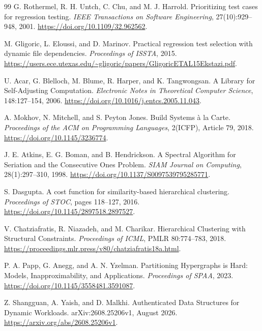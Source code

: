 \begin{thebibliography}{99}
 G. Rothermel, R. H. Untch, C. Chu, and M. J. Harrold. Prioritizing test cases for regression testing. \emph{IEEE Transactions on Software Engineering}, 27(10):929--948, 2001. \url{https://doi.org/10.1109/32.962562}.

 M. Gligoric, L. Eloussi, and D. Marinov. Practical regression test selection with dynamic file dependencies. \emph{Proceedings of ISSTA}, 2015. \url{https://users.ece.utexas.edu/~gligoric/papers/GligoricETAL15Ekstazi.pdf}.

 U. Acar, G. Blelloch, M. Blume, R. Harper, and K. Tangwongsan. A Library for Self-Adjusting Computation. \emph{Electronic Notes in Theoretical Computer Science}, 148:127--154, 2006. \url{https://doi.org/10.1016/j.entcs.2005.11.043}.

 A. Mokhov, N. Mitchell, and S. Peyton Jones. Build Systems \`a la Carte. \emph{Proceedings of the ACM on Programming Languages}, 2(ICFP), Article 79, 2018. \url{https://doi.org/10.1145/3236774}.

 J. E. Atkins, E. G. Boman, and B. Hendrickson. A Spectral Algorithm for Seriation and the Consecutive Ones Problem. \emph{SIAM Journal on Computing}, 28(1):297--310, 1998. \url{https://doi.org/10.1137/S0097539795285771}.

 S. Dasgupta. A cost function for similarity-based hierarchical clustering. \emph{Proceedings of STOC}, pages 118--127, 2016. \url{https://doi.org/10.1145/2897518.2897527}.

 V. Chatziafratis, R. Niazadeh, and M. Charikar. Hierarchical Clustering with Structural Constraints. \emph{Proceedings of ICML}, PMLR 80:774--783, 2018. \url{https://proceedings.mlr.press/v80/chatziafratis18a.html}.

 P. A. Papp, G. Anegg, and A. N. Yzelman. Partitioning Hypergraphs is Hard: Models, Inapproximability, and Applications. \emph{Proceedings of SPAA}, 2023. \url{https://doi.org/10.1145/3558481.3591087}.

 Z. Shangguan, A. Yaish, and D. Malkhi. Authenticated Data Structures for Dynamic Workloads. arXiv:2608.25206v1, August 2026. \url{https://arxiv.org/abs/2608.25206v1}.
\end{thebibliography}
